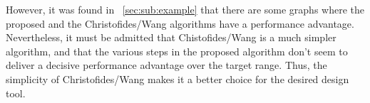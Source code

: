 However, it was found in \sectionname~\ref{sec:sub:example} that there are some graphs where the proposed and the
Christofides/Wang algorithms have a performance advantage.  Nevertheless, it must be admitted that Chistofides/Wang
is a much simpler algorithm, and that the various steps in the proposed algorithm don't seem to deliver a decisive
performance advantage over the target range.  Thus, the simplicity of Christofides/Wang makes it a better choice
for the desired design tool.

